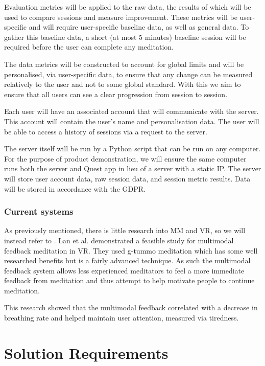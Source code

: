 \documentclass[coverpage,lineno]{../custom}
\begin{document}
Evaluation metrics will be applied to the raw data, the results of which will be used to compare sessions and measure improvement. These metrics will be user-specific and will require user-specific baseline data, as well as general data. To gather this baseline data, a short (at most 5 minutes) baseline session will be required before the user can complete any meditation.

The data metrics will be constructed to account for global limits and will be personalised, via user-specific data, to ensure that any change can be measured relatively to the user and not to some global standard. With this we aim to ensure that all users can see a clear progression from session to session.

Each user will have an associated account that will communicate with the server. This account will contain the user's name and personalisation data. The user will be able to access a history of sessions via a request to the server.

The server itself will be run by a Python script that can be run on any computer. For the purpose of product demonstration, we will ensure the same computer runs both the server and Quest app in lieu of a server with a static IP. The server will store user account data, raw session data, and session metric results. Data will be stored in accordance with the GDPR.

\subsubsection{Current systems}

As previously mentioned, there is little research into MM and VR, so we will instead refer to \cite{lan_slow_2021}. Lan et al. demonstrated a feasible study for multimodal feedback meditation in VR. They used g-tummo meditation which has some well researched benefits \cite{kozhevnikov_neurocognitive_2013} but is a fairly advanced technique. As such the multimodal feedback system allows less experienced meditators to feel a more immediate feedback from meditation and thus attempt to help motivate people to continue meditation.

This research showed that the multimodal feedback correlated with a decrease in breathing rate and helped maintain user attention, measured via tiredness.

\section{Solution Requirements}
\label{sec:req}
\end{document}
